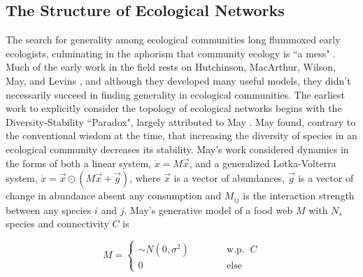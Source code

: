 \documentclass[]{article}
\begin{document}
\hypertarget{the-structure-of-ecological-networks}{%
\subsection{The Structure of Ecological
Networks}\label{the-structure-of-ecological-networks}}

The search for generality among ecological communities long flummoxed
early ecologists, culminating in the aphorism that community ecology is ``a mess" \citep{lawton_are_1999, simberloff_community_2004, vellend_conceptual_2010}. Much of the early work in the field rests on Hutchinson, MacArthur, Wilson, May, and Levins \citep{ hutchinson_homage_1959, macarthur_competition_1964, macarthur_patterns_1965, macarthur_limiting_1967,macarthur_species_1970,macarthur_theory_2016, hutchinson_ecological_1973}, and although they developed many useful models, they didn't necessarily succeed in finding generality in ecological communities.
The earliest work to explicitly consider the topology of ecological networks begins with the Diversity-Stability ``Paradox", largely attributed to May \citep{may_will_1972,may_stability_2001}. May found, contrary
to the conventional wisdom at the time, that increasing the diversity of
species in an ecological community decreases its stability. May's work
considered dynamics in the forms of both a linear system, \(\dot{x} = M\vec{x}\), and a
generalized Lotka-Volterra system,
\(\dot{x} = \vec{x} \odot (M \vec{x} + \vec{g})\), where \(\vec{x}\) is
a vector of abundances, \(\vec{g}\) is a vector of change in abundance
absent any consumption and \(M_{ij}\) is the interaction strength between any species \(i\) and
\(j\).  May's generative model of a food web \(M\) with \(N_s\)
species and connectivity $C$ is

\[M = \begin{cases}\sim N(0, \sigma^2) \quad\quad\quad &\text{w.p. }\ C\\ 0 &\text{else}\end{cases}\]
\end{document}
